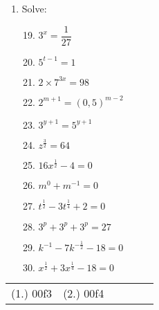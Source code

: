 \begin{eocexercises}{}
\begin{enumerate}[label=\textbf{\arabic*}., itemsep=5pt]
  \item Solve:
    \begin{multicols}{2}
      \begin{enumerate}[label=\textbf{(\alph*)}, itemsep=7pt]
        \setcounter{enumi}{18}
      \item $ 3^x = \dfrac{1}{27} $
      \item $ 5^{t-1} = 1 $
      \item $ 2 \times 7^{3x} = 98 $
      \item $ 2^{m+1} = (0,5)^{m-2}$
      \item $ 3^{y+1} = 5^{y+1} $
      \item $ z^{\frac{3}{2}} = 64 $
      \item $ 16x^{\frac{1}{2}} - 4 = 0 $
      \item $ m^0 + m^{-1} = 0 $
      \item $ t^{\frac{1}{2}} - 3t^{\frac{1}{4}} + 2 = 0 $
      \item $ 3^p + 3^p + 3^p = 27 $
      \item $ k^{-1} - 7k^{-\frac{1}{2}} -18 = 0 $
      \item $ x^{\frac{1}{2}}+3x^{\frac{1}{4}}-18 = 0 $
      \end{enumerate}
    \end{multicols}
  \end{enumerate}
\practiceinfo
\par 
\begin{tabular}[h]{cccccc}
(1.) 00f3& (2.) 00f4\end{tabular}
\end{eocexercises}

 